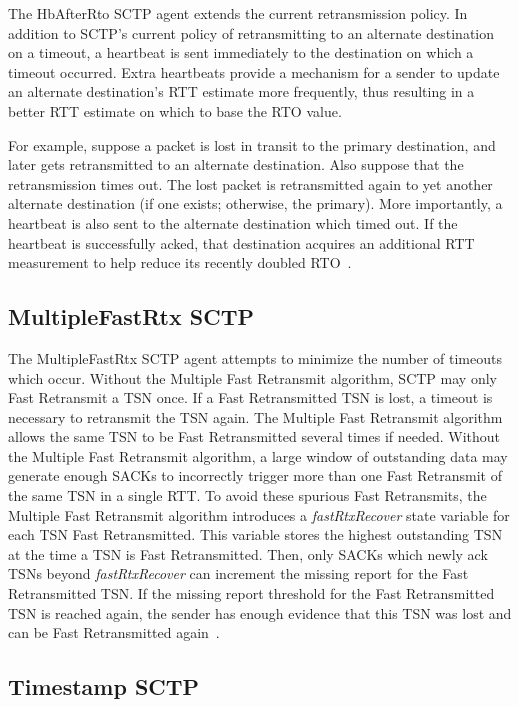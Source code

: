 	 The HbAfterRto SCTP agent extends the current retransmission
	 policy. In addition to SCTP's current policy of retransmitting to
	 an alternate destination on a timeout, a heartbeat is sent
	 immediately to the destination on which a timeout occurred. Extra
	 heartbeats provide a mechanism for a sender to update an
	 alternate destination's RTT estimate more frequently, thus
	 resulting in a better RTT estimate on which to base the RTO
	 value.

	 For example, suppose a packet is lost in transit to the primary
	 destination, and later gets retransmitted to an alternate
	 destination. Also suppose that the retransmission times out. The
	 lost packet is retransmitted again to yet another alternate
	 destination (if one exists; otherwise, the primary). More
	 importantly, a heartbeat is also sent to the alternate
	 destination which timed out. If the heartbeat is successfully
	 acked, that destination acquires an additional RTT measurement to
	 help reduce its recently doubled RTO~\cite{SCTP_CARO_2003e}.

      \subsection{MultipleFastRtx SCTP}
      \label{ssec:mfr}

	 The MultipleFastRtx SCTP agent attempts to minimize the number of
	 timeouts which occur. Without the Multiple Fast Retransmit
	 algorithm, SCTP may only Fast Retransmit a TSN once. If a Fast
	 Retransmitted TSN is lost, a timeout is necessary to retransmit
	 the TSN again. The Multiple Fast Retransmit algorithm allows the
	 same TSN to be Fast Retransmitted several times if
	 needed. Without the Multiple Fast Retransmit algorithm, a large
	 window of outstanding data may generate enough SACKs to
	 incorrectly trigger more than one Fast Retransmit of the same TSN
	 in a single RTT.  To avoid these spurious Fast Retransmits, the
	 Multiple Fast Retransmit algorithm introduces a {\em
	 fastRtxRecover} state variable for each TSN Fast
	 Retransmitted. This variable stores the highest outstanding TSN
	 at the time a TSN is Fast Retransmitted. Then, only SACKs which
	 newly ack TSNs beyond {\em fastRtxRecover} can increment the
	 missing report for the Fast Retransmitted TSN. If the missing
	 report threshold for the Fast Retransmitted TSN is reached again,
	 the sender has enough evidence that this TSN was lost and can be
	 Fast Retransmitted again~\cite{SCTP_CARO_2003e}.

      \subsection{Timestamp SCTP}

